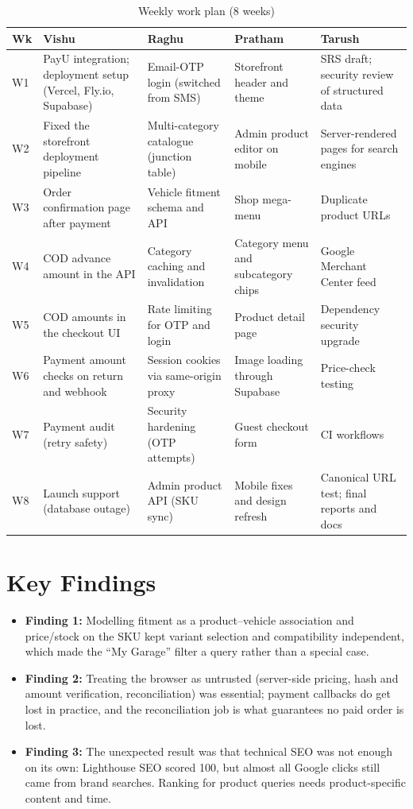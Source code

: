 \documentclass{tietreport}
\begin{document}
\begin{table}[H]
\centering\scriptsize
\begin{tabularx}{\linewidth}{@{}l X X X X@{}}
\toprule
\textbf{Wk} & \textbf{Vishu} & \textbf{Raghu} & \textbf{Pratham} & \textbf{Tarush} \\
\midrule
W1 & PayU integration; deployment setup (Vercel, Fly.io, Supabase) & Email-OTP login (switched from SMS) & Storefront header and theme & SRS draft; security review of structured data \\
W2 & Fixed the storefront deployment pipeline & Multi-category catalogue (junction table) & Admin product editor on mobile & Server-rendered pages for search engines \\
W3 & Order confirmation page after payment & Vehicle fitment schema and API & Shop mega-menu & Duplicate product URLs \\
W4 & COD advance amount in the API & Category caching and invalidation & Category menu and subcategory chips & Google Merchant Center feed \\
W5 & COD amounts in the checkout UI & Rate limiting for OTP and login & Product detail page & Dependency security upgrade \\
W6 & Payment amount checks on return and webhook & Session cookies via same-origin proxy & Image loading through Supabase & Price-check testing \\
W7 & Payment audit (retry safety) & Security hardening (OTP attempts) & Guest checkout form & CI workflows \\
W8 & Launch support (database outage) & Admin product API (SKU sync) & Mobile fixes and design refresh & Canonical URL test; final reports and docs \\
\bottomrule
\end{tabularx}
\caption{Weekly work plan (8 weeks)}
\label{tab:weekly}
\end{table}


\section{Key Findings}

\begin{itemize}
  \item \textbf{Finding 1:} Modelling fitment as a product--vehicle
        association and price/stock on the SKU kept variant selection and
        compatibility independent, which made the ``My Garage'' filter a
        query rather than a special case.
  \item \textbf{Finding 2:} Treating the browser as untrusted (server-side
        pricing, hash and amount verification, reconciliation) was essential;
        payment callbacks do get lost in practice, and the reconciliation job
        is what guarantees no paid order is lost.
  \item \textbf{Finding 3:} The unexpected result was that technical SEO was
        not enough on its own: Lighthouse SEO scored 100, but almost all Google
        clicks still came from brand searches. Ranking for product queries
        needs product-specific content and time.
\end{itemize}
\end{document}
